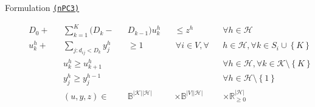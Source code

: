 \documentclass[utf8,aspectratio=1610,ngerman,english]{beamer}
\newcommand{\nPCE}{\hyperref[eq:nPCE]{\texttt{(nPC3)}}\xspace}
\newcommand{\inH}{h \in \mathcal H}
\begin{document}
\begin{frame}{Formulation \nPCE}
\begin{minipage}[t]{0.59\linewidth}
\begin{block}
\begin{subequations}
\begin{alignat*}{9}
                     &              &  & D_0 +     &  & \sum_{k=1}^{K} (D_k-        &  & D_{k-1})u^{h}_k                      &  & \leq z^h \;                        &  & \forall h \in \mathcal{H}                                                          \\
                     &              &  & u^{h}_k + &  & \sum_{j:d_{ij}<D_k} y_{j}^h &  & \geq 1                               &  & \,\forall i \in V,\forall          &  & h \in \mathcal H, \forall k \in S_i \cup \left \{K \right \}                       \\
                     &              &  &           &  & u^{h}_k \geq u_{k+1}^h      &  &                                      &  &                                    &  & \forall h \in \mathcal{H}, \forall k \in \mathcal{K} \setminus \left \{K \right \} \\
                     &              &  &           &  & y_{j}^h \geq y_j^{h-1}      &  &                                      &  &                                    &  & \forall \inH \setminus \left \{1 \right \}                                         \\
                     &              &  &           &  & (u,y,z)  \in                &  & \mathbb B^{|\mathcal K||\mathcal H|} &  & \times \mathbb B^{|V||\mathcal H|} &  & \times \mathbb{R}_{\geq 0}^{|\mathcal H|}
                \end{alignat*}
            \end{subequations}
        \end{block}
    \end{minipage}
\end{frame}


\end{document}
